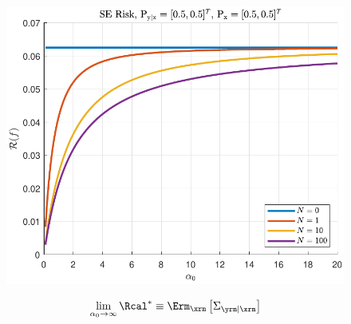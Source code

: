 \documentclass[aspectratio=169,usenames,dvipsnames]{beamer}
\begin{document}
\begin{frame}
\begin{columns}[c]
\begin{column}{0.5\linewidth}
\begin{figure}
\centering
\includegraphics[width=0.9\linewidth]{Risk_SE_Dir_IO_a0_leg_N.pdf}
\end{figure}
%
\vspace{-0.25em}
\begin{equation*}
\lim_{\alpha_0 \to \infty} \Rcal^* \equiv \Erm_{\xrm} \left[ \Sigma_{\yrm | \xrm} \right]
\end{equation*}

\end{column}

\end{columns}

\end{frame}
\end{document}
